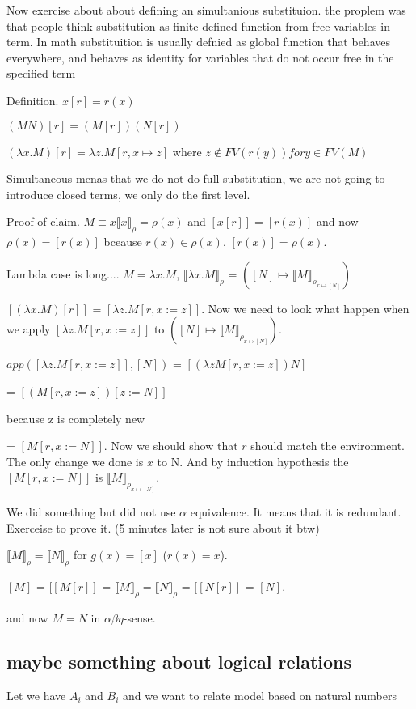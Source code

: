 \documentclass[a4paper,10pt]{book}
\newcommand{\sem}[2]{ \llbracket#1\rrbracket_{#2} }
\begin{document}
Now exercise about about defining an simultanious substituion. the proplem was that people 
think substitution as finite-defined function from free variables in term. In math substituition is 
usually defnied as global function that behaves everywhere, and behaves as identity for variables 
that do not occur free in the specified term

Definition.
$x[r] = r(x)$

$(MN)[r] = (M[r])(N[r])$

$(\lambda x . M)[r] = \lambda z . M[r, x \mapsto z] $ where $z \not\in  FV(r(y)) for y \in FV(M)$

Simultaneous menas that we do not do full substitution, we are not going to introduce closed terms,
we only do the first level.

Proof of claim.
$M\equiv x    \sem{x}{\rho} = \rho(x)$ and $[x[r]] = [r(x)]$ and now $\rho(x) = [r(x)]$ bceause 
$r(x) \in \rho(x)$, $[r(x)] = \rho(x)$.

Lambda case is long....
$M=\lambda x . M$, $\sem{\lambda x . M}{\rho}$ = $([N] \mapsto \sem{M}{\rho_{x \mapsto [N]}})$
  
$[(\lambda x . M)[r]]$ = $[\lambda z . M[r, x:= z]]$. Now we need to look what happen when we apply
$[\lambda z . M[r, x:= z]]$ to $([N] \mapsto \sem{M}{\rho_{x \mapsto [N]}})$.

$app ([\lambda z . M[r, x:= z]], [N])$ = $[(\lambda z M [r, x:=z])N]$

 = $[(M[r, x:=z])[z:=N]]$
 
 because z is completely new 
 
 = $[M[r, x := N]]$. Now we should show that $r$ should match the environment. The only change we done
 is $x$ to N. And by induction hypothesis the $[M[r, x := N]]$ is $\sem{M}{\rho_{x \mapsto [N]}}$.
 
We did something but did not use $\alpha$ equivalence. It means that it is redundant. Exerceise to prove it.
(5 minutes later is not sure about it btw)

$\sem{M}{\rho} = \sem{N}{\rho}$ for $g(x)=[x]$ ($r(x)=x$).

 $[M]$ = $[[M[r]]$ = $\sem{M}{\rho} = \sem{N}{\rho}$ =  $[[N[r]]$ = $[N]$.
 
 and now $M=N$ in $\alpha\beta\eta$-sense.


  
\subsection{maybe something about logical relations}
Let we have $A_i$ and $B_i$ and we want to relate model based on natural numbers
\end{document}
